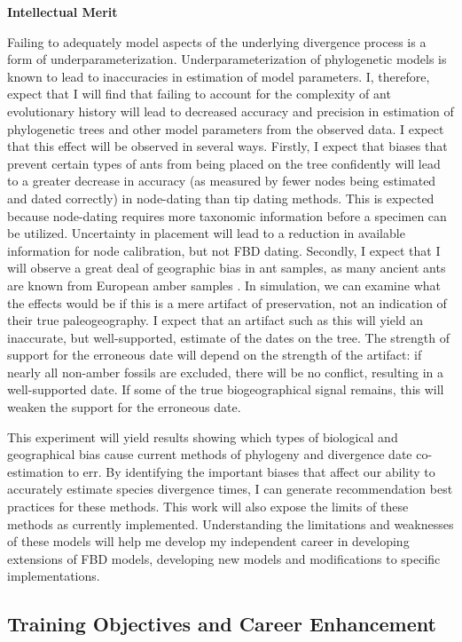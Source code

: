 \documentclass[]{article}
\begin{document}
\textbf{Intellectual Merit} \par 
Failing to adequately model aspects of the underlying divergence process is a form of underparameterization. Underparameterization of phylogenetic models is known to lead to inaccuracies in estimation of model parameters. I, therefore, expect that I will find that failing to account for the complexity of ant evolutionary history will lead to decreased accuracy and precision in estimation of phylogenetic trees and other model parameters from the observed data. I expect that this effect will be observed in several ways. Firstly, I expect that biases that prevent certain types of ants from being placed on the tree confidently will lead to a greater decrease in accuracy (as measured by fewer nodes being estimated and dated correctly) in node-dating than tip dating methods. This is expected because node-dating requires more taxonomic information before a specimen can be utilized. Uncertainty in placement will lead to a reduction in available information for node calibration, but not FBD dating. Secondly, I expect that I will observe a great deal of geographic bias in ant samples, as many ancient ants are known from European amber samples \citep{perrichot2008fossil}. In simulation, we can examine what the effects would be if this is a mere artifact of preservation, not an indication of their true paleogeography. I expect that an artifact such as this will yield an inaccurate, but well-supported, estimate of the dates on the tree. The strength of support for the erroneous date will depend on the strength of the artifact: if nearly all non-amber fossils are excluded, there will be no conflict, resulting in a well-supported date. If some of the true biogeographical signal remains, this will weaken the support for the erroneous date. \par
This experiment will yield results showing which types of biological and geographical bias cause current methods of phylogeny and divergence date co-estimation to err.  By identifying the important biases that affect our ability to accurately estimate species divergence times, I can generate recommendation best practices for these methods. This work will also expose the limits of these methods as currently implemented. Understanding the limitations and weaknesses of these models will help me develop my independent career in developing extensions of FBD models, developing new models and modifications to specific implementations.
\subsection*{Training Objectives and Career Enhancement}
\end{document}
